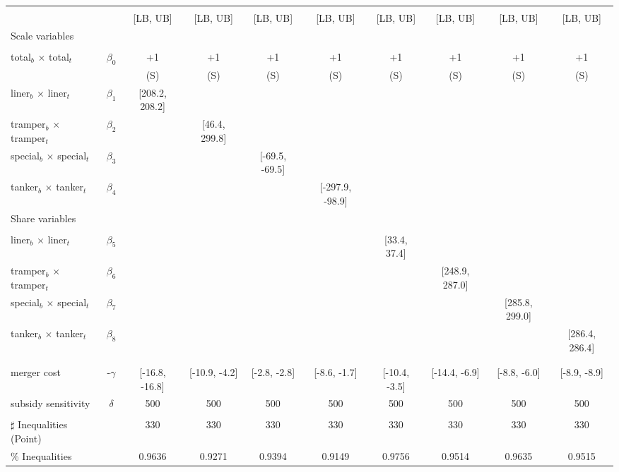 \begin{tabular}{@{\extracolsep{5pt}}lccccccccc}
\toprule 
 &  &  &  &  &  &  &  &  &  \\
 &  & [LB, UB] & [LB, UB] & [LB, UB] & [LB, UB] & [LB, UB] & [LB, UB] & [LB, UB] & [LB, UB] \\
\midrule 
Scale variables &  &  &  &  &  &  &  \\
 &  &  &  &  &  &  &  &  \\
total$_{b}$ $\times$ total$_{t}$ & $\beta_0$ & +1 & +1 & +1 & +1 & +1 & +1 & +1 & +1 \\
 &  & (S) & (S) & (S) & (S) & (S) & (S) & (S) & (S) \\
liner$_{b}$ $\times$ liner$_{t}$ & $\beta_1$ & [208.2, 208.2] &  &  &  &  &  &  &  \\
tramper$_{b}$ $\times$ tramper$_{t}$ & $\beta_2$ &  & [46.4, 299.8] &  &  &  &  &  &  \\
special$_{b}$ $\times$ special$_{t}$ & $\beta_3$ &  &  & [-69.5, -69.5] &  &  &  &  &  \\
tanker$_{b}$ $\times$ tanker$_{t}$ & $\beta_4$ &  &  &  & [-297.9, -98.9] &  &  &  &  \\
Share variables &  &  &  &  &  &  &  &  &  \\
 &  &  &  &  &  &  &  &  &  \\
liner$_{b}$ $\times$ liner$_{t}$ & $\beta_5$ &  &  &  &  & [33.4, 37.4] &  &  &  \\
tramper$_{b}$ $\times$ tramper$_{t}$ & $\beta_6$ &  &  &  &  &  & [248.9, 287.0] &  &  \\
special$_{b}$ $\times$ special$_{t}$ & $\beta_7$ &  &  &  &  &  &  & [285.8, 299.0] &  \\
tanker$_{b}$ $\times$ tanker$_{t}$ & $\beta_8$ &  &  &  &  &  &  &  & [286.4, 286.4] \\
 &  &  &  &  &  &  &  &  &  \\
 &  &  &  &  &  &  &  &  &  \\
merger cost & -$\gamma$ & [-16.8, -16.8] & [-10.9, -4.2] & [-2.8, -2.8] & [-8.6, -1.7] & [-10.4, -3.5] & [-14.4, -6.9] & [-8.8, -6.0] & [-8.9, -8.9] \\
subsidy sensitivity & $\delta$ & 500 & 500 & 500 & 500 & 500 & 500 & 500 & 500 \\
 &  &  &  &  &  &  &  &  &  \\
\hline 
$\sharp$ Inequalities (Point) &  & 330 & 330 & 330 & 330 & 330 & 330 & 330 & 330 \\
\% Inequalities &  & 0.9636 & 0.9271 & 0.9394 & 0.9149 & 0.9756 & 0.9514 & 0.9635 & 0.9515 \\
\bottomrule 
\end{tabular}
